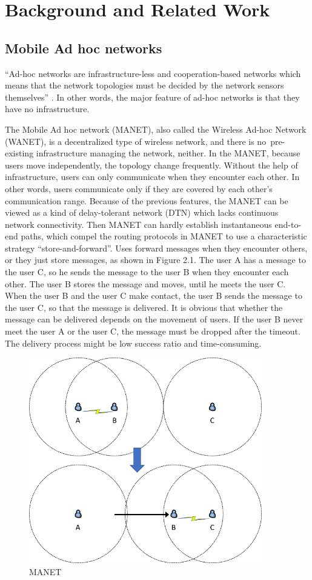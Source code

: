 \chapter {Background and Related Work}
\label{RW}
\section{ Mobile Ad hoc networks}
\noindent ``Ad-hoc networks are infrastructure-less and cooperation-based networks which means that the network topologies must be decided by the network sensors themselves'' \cite {C14}. In other words, the major feature of ad-hoc networks is that they have no infrastructure.

The Mobile Ad hoc network (MANET), also called the Wireless Ad-hoc Network (WANET), is a decentralized type of wireless network, and there is no~pre-existing infrastructure managing the network, neither. In the MANET, because users move independently, the topology change frequently. Without the help of infrastructure, users can only communicate when they encounter each other. In other words, users communicate only if they are covered by each other's communication range. Because of the previous features, the MANET can be viewed as a kind of delay-tolerant network (DTN) which lacks continuous network connectivity. Then MANET can hardly establish instantaneous end-to-end paths, which compel the routing protocols in MANET to use a characteristic strategy ``store-and-forward''. Uses forward messages when they encounter others, or they just store messages, as shown in Figure 2.1. The user A has a message to the user C, so he sends the message to the user B when they encounter each other. The user B stores the message and moves, until he meets the user C. When the user B and the user C make contact, the user B sends the message to the user C, so that the message is delivered. It is obvious that whether the message can be delivered depends on the movement of users. If the user B never meet the user A or the user C, the message must be dropped after the timeout. The delivery process might be low success ratio and time-consuming.

\begin{figure} [H]
  \centering 
  \includegraphics[width=4.0in]{figures/FIG_MANET.png}
  \caption{MANET} 
  \label{fig:MANET} %
\end{figure}

